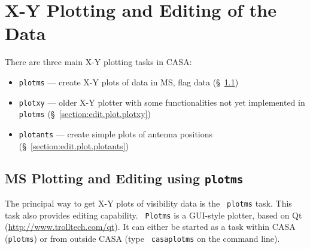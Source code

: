  

\section{X-Y Plotting and Editing of the Data}
\label{section:edit.plot}

There are three main X-Y plotting tasks in CASA:
\begin{itemize}
   \item {\tt plotms} --- create X-Y plots of data in MS, flag data
      (\S~\ref{section:edit.plot.plotms})
   \item {\tt plotxy} --- older X-Y plotter with some functionalities not yet implemented in {\tt plotms}
      (\S~\ref{section:edit.plot.plotxy})
   \item {\tt plotants} --- create simple plots of antenna positions
      (\S~\ref{section:edit.plot.plotants})
\end{itemize}

\subsection{MS Plotting and Editing using {\tt plotms}}
\label{section:edit.plot.plotms}

The principal way to get X-Y plots of visibility data is the {\tt
  plotms} task. This task also provides editing capability. {\tt
  Plotms} is a GUI-style plotter, based on Qt
(\url{http://www.trolltech.com/qt}). It can either be started as a
task within CASA ({\tt plotms}) or from outside CASA (type {\tt
  casaplotms} on the command line).

